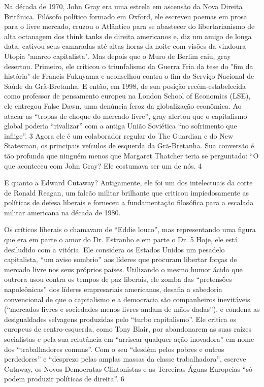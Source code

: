 \par
 
Na década de 1970, John Gray era uma estrela em ascensão da Nova Direita Britânica. Filósofo político formado em Oxford, ele escreveu poemas em prosa para o livre mercado, cruzou o Atlântico para se abastecer do libertarianismo de alta octanagem dos think tanks de direita americanos e, diz um amigo de longa data, cativou seus camaradas até altas horas da noite com visões da vindoura Utopia "anarco capitalista". Mas depois que o Muro de Berlim caiu, gray desertou. Primeiro, ele criticou o triunfalismo da Guerra Fria da tese do "fim da história" de Francis Fukuyama e aconselhou contra o fim do Serviço Nacional de Saúde da Grã-Bretanha. E então, em 1998, de sua posição recém-estabelecida como professor de pensamento europeu na London School of Economics (LSE), ele entregou False Dawn, uma denúncia feroz da globalização econômica. Ao atacar as “tropas de choque do mercado livre”, gray alertou que o capitalismo global poderia “rivalizar” com a antiga União Soviética “no sofrimento que inflige”.
 {\color{blue} 3}  
Agora ele é um colaborador regular do The Guardian e do New Statesman, os principais veículos de esquerda da Grã-Bretanha. Sua conversão é tão profunda que ninguém menos que Margaret Thatcher teria se perguntado: “O que aconteceu com John Gray? Ele costumava ser um de nós.
 {\color{blue} 4}  

 
\par
 
E quanto a Edward Cutaway? Antigamente, ele foi um dos intelectuais da corte de Ronald Reagan, um falcão militar brilhante que criticou impiedosamente as políticas de defesa liberais e forneceu a fundamentação filosófica para a escalada militar americana na década de 1980.
 
\par
 
Os críticos liberais o chamavam de “Eddie louco”, mas representando uma figura que era em parte o amor do Dr. Estranho e em parte o Dr.
 {\color{blue} 5}  
Hoje, ele está desiludido com a vitória. Ele considera os Estados Unidos um pesadelo capitalista, “um aviso sombrio” aos líderes que procuram libertar forças de mercado livre nos seus próprios países. Utilizando o mesmo humor ácido que outrora usou contra os tempos de paz liberais, ele zomba das “pretensões napoleônicas” dos líderes empresariais americanos, desafia a sabedoria convencional de que o capitalismo e a democracia são companheiros inevitáveis ​​(“mercados livres e sociedades menos livres andam de mãos dadas”), e condena as desigualdades selvagens produzidas pelo “turbo capitalismo”. Ele critica os europeus de centro-esquerda, como Tony Blair, por abandonarem as suas raízes socialistas e pela sua relutância em “arriscar qualquer ação inovadora” em nome dos “trabalhadores comuns”. Com o seu “desdém pelos pobres e outros perdedores” e “desprezo pelas amplas massas da classe trabalhadora”, escreve Cutaway, os Novos Democratas Clintonistas e as Terceiras Águas Europeias “só podem produzir políticas de direita”.
 {\color{blue} 6}  

